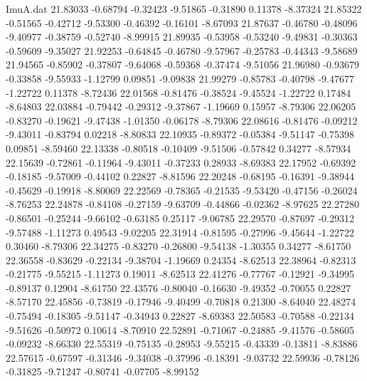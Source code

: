 \begin{filecontents}{ImuA.dat}
  21.83033   -0.68794   -0.32423   -9.51865   -0.31890    0.11378   -8.37324
  21.85322   -0.51565   -0.42712   -9.53300   -0.46392   -0.16101   -8.67093
  21.87637   -0.46780   -0.48096   -9.40977   -0.38759   -0.52740   -8.99915
  21.89935   -0.53958   -0.53240   -9.49831   -0.30363   -0.59609   -9.35027
  21.92253   -0.64845   -0.46780   -9.57967   -0.25783   -0.44343   -9.58689
  21.94565   -0.85902   -0.37807   -9.64068   -0.59368   -0.37474   -9.51056
  21.96980   -0.93679   -0.33858   -9.55933   -1.12799    0.09851   -9.09838
  21.99279   -0.85783   -0.40798   -9.47677   -1.22722    0.11378   -8.72436
  22.01568   -0.81476   -0.38524   -9.45524   -1.22722    0.17484   -8.64803
  22.03884   -0.79442   -0.29312   -9.37867   -1.19669    0.15957   -8.79306
  22.06205   -0.83270   -0.19621   -9.47438   -1.01350   -0.06178   -8.79306
  22.08616   -0.81476   -0.09212   -9.43011   -0.83794    0.02218   -8.80833
  22.10935   -0.89372   -0.05384   -9.51147   -0.75398    0.09851   -8.59460
  22.13338   -0.80518   -0.10409   -9.51506   -0.57842    0.34277   -8.57934
  22.15639   -0.72861   -0.11964   -9.43011   -0.37233    0.28933   -8.69383
  22.17952   -0.69392   -0.18185   -9.57009   -0.44102    0.22827   -8.81596
  22.20248   -0.68195   -0.16391   -9.38944   -0.45629   -0.19918   -8.80069
  22.22569   -0.78365   -0.21535   -9.53420   -0.47156   -0.26024   -8.76253
  22.24878   -0.84108   -0.27159   -9.63709   -0.44866   -0.02362   -8.97625
  22.27280   -0.86501   -0.25244   -9.66102   -0.63185    0.25117   -9.06785
  22.29570   -0.87697   -0.29312   -9.57488   -1.11273    0.49543   -9.02205
  22.31914   -0.81595   -0.27996   -9.45644   -1.22722    0.30460   -8.79306
  22.34275   -0.83270   -0.26800   -9.54138   -1.30355    0.34277   -8.61750
  22.36558   -0.83629   -0.22134   -9.38704   -1.19669    0.24354   -8.62513
  22.38964   -0.82313   -0.21775   -9.55215   -1.11273    0.19011   -8.62513
  22.41276   -0.77767   -0.12921   -9.34995   -0.89137    0.12904   -8.61750
  22.43576   -0.80040   -0.16630   -9.49352   -0.70055    0.22827   -8.57170
  22.45856   -0.73819   -0.17946   -9.40499   -0.70818    0.21300   -8.64040
  22.48274   -0.75494   -0.18305   -9.51147   -0.34943    0.22827   -8.69383
  22.50583   -0.70588   -0.22134   -9.51626   -0.50972    0.10614   -8.70910
  22.52891   -0.71067   -0.24885   -9.41576   -0.58605   -0.09232   -8.66330
  22.55319   -0.75135   -0.28953   -9.55215   -0.43339   -0.13811   -8.83886
  22.57615   -0.67597   -0.31346   -9.34038   -0.37996   -0.18391   -9.03732
  22.59936   -0.78126   -0.31825   -9.71247   -0.80741   -0.07705   -8.99152

\end{filecontents}

